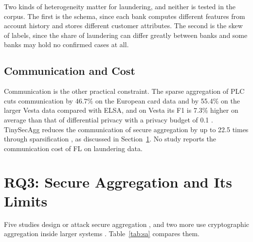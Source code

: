 \documentclass[journal]{IEEEtran}
\begin{document}
Two kinds of heterogeneity matter for laundering, and neither is tested in the corpus. The first is the schema, since each bank computes different features from account history and stores different customer attributes. The second is the skew of labels, since the share of laundering can differ greatly between banks and some banks may hold no confirmed cases at all.

\subsection{Communication and Cost}

Communication is the other practical constraint. The sparse aggregation of PLC cuts communication by 46.7\% on the European card data and by 55.4\% on the larger Vesta data compared with ELSA, and on Vesta its F1 is 7.3\% higher on average than that of differential privacy with a privacy budget of 0.1 \cite{li2026plc}. TinySecAgg reduces the communication of secure aggregation by up to 22.5 times through sparsification \cite{sami2024tinysecagg}, as discussed in Section~\ref{sec:rq3}. No study reports the communication cost of FL on laundering data.

\section{RQ3: Secure Aggregation and Its Limits}
\label{sec:rq3}

Five studies design or attack secure aggregation \cite{yang2022accountable,zhang2023safelearning,gao2023category,sami2024tinysecagg,wang2023vosa}, and two more use cryptographic aggregation inside larger systems \cite{xiong2025hppbefl,li2026plc}. Table~\ref{tab:sa} compares them.
\end{document}
